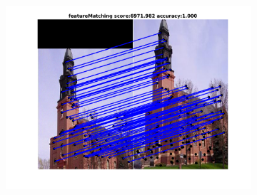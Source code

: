 \begin{figure}[h]
\begin{subfigure}[b]{0.33\textwidth}
		\includegraphics[scale=0.25]{"chapter3/fig/ImageTrafo/anchor_descr/using_cpd_afftrafo/fi_2_featureMatching"} 
	\end{subfigure} 	
	

\end{figure}
